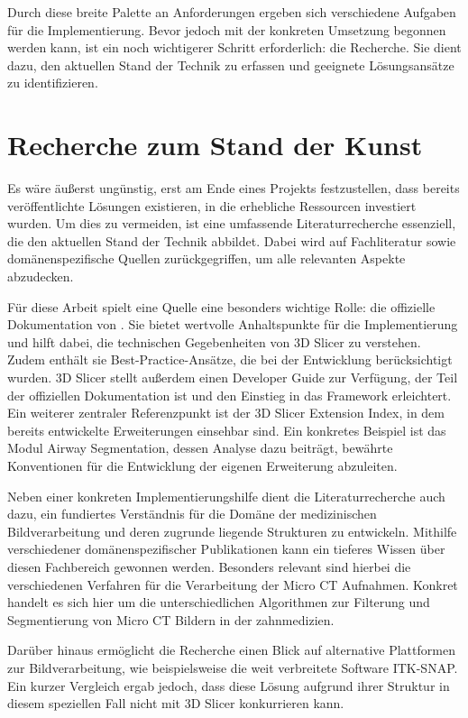 Durch diese breite Palette an Anforderungen ergeben sich verschiedene Aufgaben für
die Implementierung. Bevor jedoch mit der konkreten Umsetzung begonnen werden
kann, ist ein noch wichtigerer Schritt erforderlich: die Recherche. Sie dient dazu,
den aktuellen Stand der Technik zu erfassen und geeignete Lösungsansätze zu
identifizieren.

\section{Recherche zum Stand der Kunst}
Es wäre äußerst ungünstig, erst am Ende eines Projekts festzustellen, dass
bereits veröffentlichte Lösungen existieren, in die erhebliche Ressourcen investiert
wurden. Um dies zu vermeiden, ist eine umfassende Literaturrecherche essenziell,
die den aktuellen Stand der Technik abbildet. Dabei wird auf Fachliteratur sowie
domänenspezifische Quellen zurückgegriffen, um alle relevanten Aspekte
abzudecken.

Für diese Arbeit spielt eine Quelle eine besonders wichtige Rolle: die offizielle
Dokumentation von \citet{slicer2024}. Sie bietet wertvolle Anhaltspunkte für die
Implementierung und hilft dabei, die technischen Gegebenheiten von 3D Slicer zu
verstehen. Zudem enthält sie Best-Practice-Ansätze, die bei der Entwicklung
berücksichtigt wurden. 3D Slicer stellt außerdem einen Developer Guide zur Verfügung,
der Teil der offiziellen Dokumentation ist und den Einstieg in das Framework
erleichtert. Ein weiterer zentraler Referenzpunkt ist der 3D Slicer Extension Index,
in dem bereits entwickelte Erweiterungen einsehbar sind. Ein konkretes Beispiel ist
das Modul Airway Segmentation, dessen Analyse dazu beiträgt, bewährte Konventionen
für die Entwicklung der eigenen Erweiterung abzuleiten.

Neben einer konkreten Implementierungshilfe dient die Literaturrecherche auch dazu,
ein fundiertes Verständnis für die Domäne der medizinischen Bildverarbeitung und
deren zugrunde liegende Strukturen zu entwickeln. Mithilfe verschiedener domänenspezifischer
Publikationen kann ein tieferes Wissen über diesen Fachbereich gewonnen werden.
Besonders relevant sind hierbei die verschiedenen Verfahren für die Verarbeitung
der Micro CT Aufnahmen. Konkret handelt es sich hier um die unterschiedlichen Algorithmen
zur Filterung und Segmentierung von Micro CT Bildern in der zahnmedizien.

Darüber hinaus ermöglicht die Recherche einen Blick auf alternative Plattformen zur
Bildverarbeitung, wie beispielsweise die weit verbreitete Software ITK-SNAP. Ein
kurzer Vergleich ergab jedoch, dass diese Lösung aufgrund ihrer Struktur in
diesem speziellen Fall nicht mit 3D Slicer konkurrieren kann.

